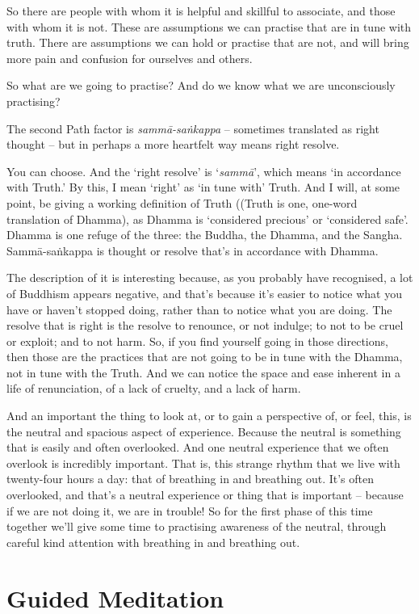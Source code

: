 So there are people with whom it is helpful and skillful to associate, and those
with whom it is not. These are assumptions we can practise that are in tune with
truth. There are assumptions we can hold or practise that are not, and will
bring more pain and confusion for ourselves and others.

So what are we going to practise? And do we know what we are unconsciously
practising?

The second Path factor is \emph{sammā-saṅkappa} -- sometimes translated as right
thought -- but in perhaps a more heartfelt way means right resolve.

You can choose. And the `right resolve' is `\emph{sammā}', which means `in
accordance with Truth.' By this, I mean `right' as `in tune with' Truth. And I
will, at some point, be giving a working definition of Truth ((Truth is one,
one-word translation of Dhamma), as Dhamma is `considered precious' or
`considered safe'. Dhamma is one refuge of the three: the Buddha, the Dhamma,
and the Sangha. Sammā-saṅkappa is thought or resolve that's in accordance with
Dhamma.

The description of it is interesting because, as you probably have recognised, a
lot of Buddhism appears negative, and that's because it's easier to notice what
you have or haven't stopped doing, rather than to notice what you are doing. The
resolve that is right is the resolve to renounce, or not indulge; to not to be
cruel or exploit; and to not harm. So, if you find yourself going in those
directions, then those are the practices that are not going to be in tune with
the Dhamma, not in tune with the Truth. And we can notice the space and ease
inherent in a life of renunciation, of a lack of cruelty, and a lack of harm.

And an important the thing to look at, or to gain a perspective of, or feel,
this, is the neutral and spacious aspect of experience. Because the neutral is
something that is easily and often overlooked. And one neutral experience that
we often overlook is incredibly important. That is, this strange rhythm that we
live with twenty-four hours a day: that of breathing in and breathing out. It's
often overlooked, and that's a neutral experience or thing that is important --
because if we are not doing it, we are in trouble! So for the first phase of
this time together we'll give some time to practising awareness of the neutral,
through careful kind attention with breathing in and breathing out.

\section{Guided Meditation}

